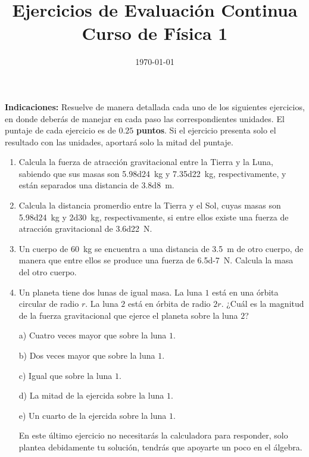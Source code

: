 \documentclass[14pt]{extarticle}
\title{\vspace*{-2cm} Ejercicios de Evaluación Continua \\ Curso de Física 1\vspace{-5ex}}
\date{\today}
\begin{document}
\maketitle

\textbf{Indicaciones:} Resuelve de manera detallada cada uno de los siguientes ejercicios, en donde deberás de manejar en cada paso las correspondientes unidades. El puntaje de cada ejercicio es de $\mathbf{0.25}$ \textbf{puntos}. Si el ejercicio presenta solo el resultado con las unidades, aportará solo la mitad del puntaje.

\begin{enumerate}
\item Calcula la fuerza de atracción gravitacional entre la Tierra y la Luna, sabiendo que sus masas son \hfill \SI{5.98d24}{\kilo\gram} y \SI{7.35d22}{\kilo\gram}, respectivamente, y están separados una distancia de \SI{3.8d8}{\meter}.
\item Calcula la distancia promerdio entre la Tierra y el Sol, cuyas masas son \SI{5.98d24}{\kilo\gram} y \SI{2d30}{\kilo\gram}, respectivamente, si entre ellos existe una fuerza de atracción gravitacional de \SI{3.6d22}{\newton}.
\item Un cuerpo de \SI{60}{\kilo\gram} se encuentra a una distancia de \SI{3.5}{\meter} de otro cuerpo, de manera que entre ellos se produce una fuerza de \SI{6.5d-7}{\newton}. Calcula la masa del otro cuerpo.
\item Un planeta tiene dos lunas de igual masa. La luna $1$ está en una órbita circular de radio $r$. La luna $2$ está en órbita de radio $2 r$. ¿Cuál es la magnitud de la fuerza gravitacional que ejerce el planeta sobre la luna $2$?

a) Cuatro veces mayor que sobre la luna $1$.

b) Dos veces mayor que sobre la luna $1$.

c) Igual que sobre la luna $1$.

d) La mitad de la ejercida sobre la luna $1$.

e) Un cuarto de la ejercida sobre la luna $1$.

En este último ejercicio no necesitarás la calculadora para responder, solo plantea debidamente tu solución, tendrás que apoyarte un poco en el álgebra. 
\end{enumerate}
\end{document}
